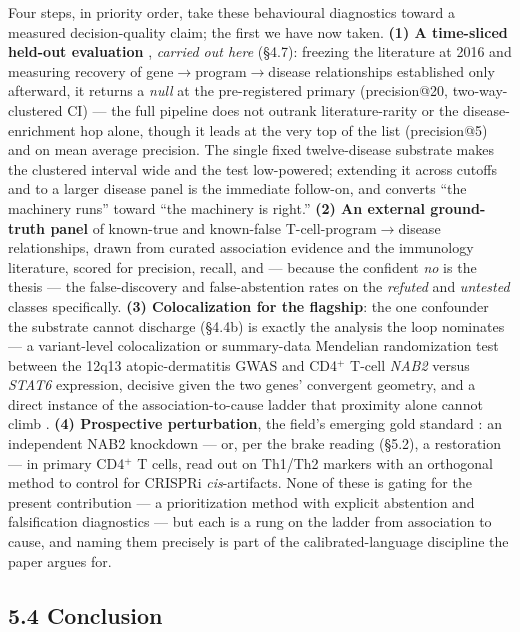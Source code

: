 Four steps, in priority order, take these behavioural diagnostics toward a measured decision-quality claim; the
first we have now taken. \textbf{(1) A time-sliced held-out evaluation} \cite{yetisgen2009}, \emph{carried out
here} (\S{}4.7): freezing the literature at 2016 and measuring recovery of
gene$\rightarrow$program$\rightarrow$disease relationships established only afterward, it returns a \emph{null}
at the pre-registered primary (precision@20, two-way-clustered CI) --- the full pipeline does not outrank
literature-rarity or the disease-enrichment hop alone, though it leads at the very top of the list (precision@5)
and on mean average precision. The single fixed twelve-disease substrate makes the clustered interval wide and
the test low-powered; extending it across cutoffs and to a larger disease panel is the immediate follow-on, and
converts ``the machinery runs'' toward ``the machinery is right.'' \textbf{(2) An external
ground-truth panel} of known-true and known-false T-cell-program$\rightarrow$disease relationships, drawn from
curated association evidence \cite{mountjoy2021} and the immunology literature, scored for precision, recall,
and --- because the confident \emph{no} is the thesis --- the false-discovery and false-abstention rates on
the \emph{refuted} and \emph{untested} classes specifically. \textbf{(3) Colocalization for the flagship}: the
one confounder the substrate cannot discharge (\S4.4b) is exactly the analysis the loop nominates --- a
variant-level colocalization or summary-data Mendelian randomization test \cite{giambartolomei2014,smr2016}
between the 12q13 atopic-dermatitis GWAS \cite{paternoster2015} and CD4$^+$ T-cell \emph{NAB2} versus
\emph{STAT6} expression, decisive given the two genes' convergent geometry, and a direct instance of the
association-to-cause ladder that proximity alone cannot climb \cite{smemo2014,schaid2018}. \textbf{(4)
Prospective perturbation}, the field's emerging gold standard \cite{gottweis2025}: an independent NAB2
knockdown --- or, per the brake reading (\S5.2), a restoration --- in primary CD4$^+$ T cells, read out on
Th1/Th2 markers with an orthogonal method to control for CRISPRi \emph{cis}-artifacts. None of these is gating
for the present contribution --- a prioritization method with explicit abstention and falsification
diagnostics --- but each is a rung on the ladder from association to cause, and naming them precisely is part
of the calibrated-language discipline the paper argues for.

\subsection*{5.4 Conclusion}\label{conclusion}

